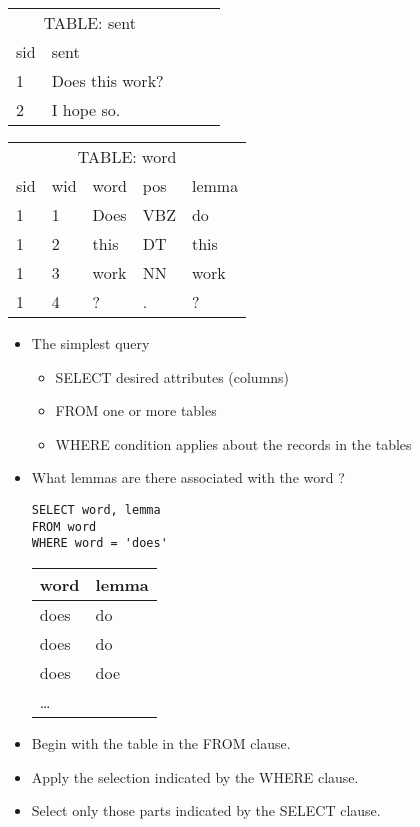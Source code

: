 \documentclass[a4paper,landscape,headrule,footrule,xetex]{foils}
\begin{document}

\begin{tabular}{lllll}
  \multicolumn{2}{c}{TABLE: sent} \\
  sid & sent \\ \hline
  1   & Does this work? \\
  2   & I hope so. \\
\end{tabular}


\begin{tabular}{lllll}
  \multicolumn{5}{c}{TABLE: word} \\
  sid & wid & word & pos & lemma \\ \hline
  1   &  1 & Does & VBZ & do \\
  1   &  2 & this & DT & this \\
  1   &  3 & work & NN & work \\
  1   &  4 & ?    & . & ? \\
\end{tabular}



\begin{itemize} \addtolength{\itemsep}{-1ex}
\item The simplest query
  \begin{itemize}
  \item SELECT desired attributes (columns)
  \item FROM one or more tables
  \item WHERE condition applies about the records  in the tables
  \end{itemize}
\item What lemmas are there associated with the word ?
\begin{verbatim}
SELECT word, lemma
FROM word
WHERE word = 'does'
\end{verbatim}

  \begin{tabular}{ll}
    \textbf{word} & \textbf{lemma} \\ \hline
    does & do \\
    does & do \\
    does & doe \\
    \ldots
  \end{tabular}
\end{itemize}


\begin{itemize}
\item Begin with the table in the FROM clause.
\item Apply the selection indicated by the WHERE clause.
\item Select only those parts indicated by the SELECT clause.
\end{itemize}
\end{document}
